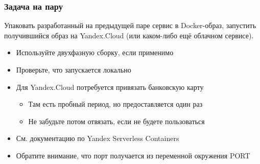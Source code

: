\documentclass{../mcsslides}
\begin{document}
    
    \begin{frame}[plain]
        \titlepage
    \end{frame}

    \begin{frame}
        \frametitle{Задача на пару}
        Упаковать разработанный на предыдущей паре сервис в Docker-образ, запустить получившийся образ на Yandex.Cloud (или каком-либо ещё облачном сервисе).
        \begin{itemize}
            \item Используйте двухфазную сборку, если применимо
            \item Проверьте, что запускается локально
            \item Для Yandex.Cloud потребуется привязать банковскую карту
            \begin{itemize}
                \item Там есть пробный период, но предоставляется один раз
                \item Не забудьте потом отвязать, если не будете пользоваться
            \end{itemize}
            \item См. документацию по Yandex Serverless Containers
            \item Обратите внимание, что порт получается из переменной окружения PORT
        \end{itemize}
    \end{frame}
\end{document}
